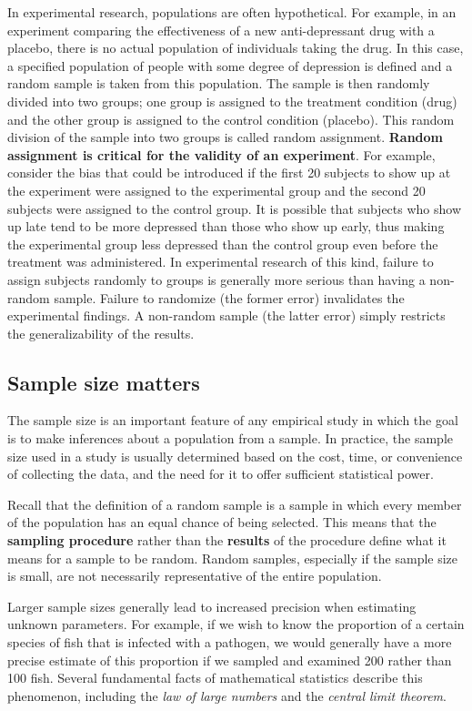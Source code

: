 \documentclass[
  12pt,
  oneside]{book}
\theoremstyle{definition}
\theoremstyle{definition}
\theoremstyle{definition}
\theoremstyle{definition}
\theoremstyle{remark}
\begin{document}
In experimental research, populations are often hypothetical. For example, in an
experiment comparing the effectiveness of a new anti-depressant drug with a
placebo, there is no actual population of individuals taking the drug. In this case, a
specified population of people with some degree of depression is defined and a
random sample is taken from this population. The sample is then randomly divided
into two groups; one group is assigned to the treatment condition (drug) and the
other group is assigned to the control condition (placebo). This random division of
the sample into two groups is called random assignment. \textbf{Random assignment is
critical for the validity of an experiment}. For example, consider the bias that could
be introduced if the first 20 subjects to show up at the experiment were assigned to
the experimental group and the second 20 subjects were assigned to the control
group. It is possible that subjects who show up late tend to be more depressed than
those who show up early, thus making the experimental group less depressed than
the control group even before the treatment was administered.
In experimental research of this kind, failure to assign subjects randomly to
groups is generally more serious than having a non-random sample. Failure to
randomize (the former error) invalidates the experimental findings. A non-random
sample (the latter error) simply restricts the generalizability of the results.

\hypertarget{sample-size-matters}{%
\subsection{Sample size matters}\label{sample-size-matters}}

The sample size is an important feature of any empirical study in which the goal is to make inferences about a population from a sample. In practice, the sample size used in a study is usually determined based on the cost, time, or convenience of collecting the data, and the need for it to offer sufficient statistical power.

Recall that the definition of a random sample is a sample in which every member of the population has an equal chance of being selected. This means that the \textbf{sampling procedure} rather than the \textbf{results} of the procedure define what it means for a sample to be random. Random samples, especially if the sample size is small, are not necessarily representative of the entire population.

Larger sample sizes generally lead to increased precision when estimating unknown parameters. For example, if we wish to know the proportion of a certain species of fish that is infected with a pathogen, we would generally have a more precise estimate of this proportion if we sampled and examined 200 rather than 100 fish. Several fundamental facts of mathematical statistics describe this phenomenon, including the \emph{law of large numbers} and the \emph{central limit theorem}.
\end{document}
